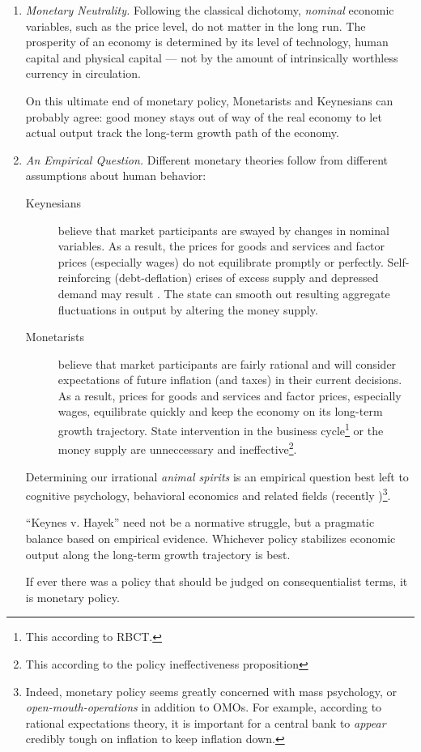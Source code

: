 \begin{enumerate}
	\item \emph{Monetary Neutrality.} \label{it:monetaryneutrality} Following the classical dichotomy, \emph{nominal} economic variables, such as the price level, do not matter in the long run. The prosperity of an economy is determined by its level of technology, human capital and physical capital --- not by the amount of intrinsically worthless currency in circulation. 
	
	On this ultimate end of monetary policy, Monetarists and Keynesians can probably agree: good money stays out of way of the real economy to let actual output track the long-term growth path of the economy.

	\item \emph{An Empirical Question.} Different monetary theories follow from different assumptions about human behavior:

	\begin{description}
		\item[Keynesians] believe that market participants are swayed by changes in nominal variables. As a result, the prices for goods and services and factor prices (especially wages) do not equilibrate promptly or perfectly. Self-reinforcing (debt-deflation) crises of excess supply and depressed demand may result \citep{Fisher1933}. The state can smooth out resulting aggregate fluctuations in output by altering the money supply. 
		\item[Monetarists] believe that market participants are fairly rational and will consider expectations of future inflation (and taxes) in their current decisions. As a result, prices for goods and services and factor prices, especially wages, equilibrate quickly and keep the economy on its long-term growth trajectory. State intervention in the business cycle\footnote{
			This according to \gls{RBCT}.} 
		or the money supply are unneccessary and ineffective\footnote{
			This according to the policy ineffectiveness proposition}.
	\end{description}

	Determining our irrational \emph{animal spirits} \citep{Keynes1936} is an empirical question best left to cognitive psychology, behavioral economics and related fields (recently \citealt{Akerlof2010})\footnote{
		Indeed, monetary policy seems greatly concerned with mass psychology, or \emph{open-mouth-operations} in addition to \gls{OMO}s. For example, according to rational expectations theory, it is important for a central bank to \emph{appear} credibly tough on inflation to keep inflation down.}. 
	
	``Keynes v. Hayek'' \citep{Wapshott2011} need not be a normative struggle, but a pragmatic balance based on empirical evidence. Whichever policy stabilizes economic output along the long-term growth trajectory is best. 
	
	If ever there was a policy that should be judged on consequentialist terms, it is monetary policy.
\end{enumerate}

